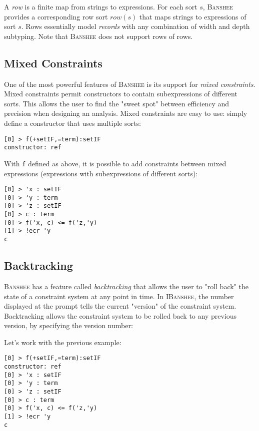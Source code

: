 \documentclass[10pt]{article}
\newcommand{\banshee}{\textsc{Banshee}}
\newcommand{\ibanshee}{\textsc{IBanshee}}
\begin{document}
A \emph{row} is a finite map from strings to expressions. For each
sort $s$, \banshee{} provides a corresponding row sort $row(s)$ that
maps strings to expressions of sort $s$. Rows essentially model
\emph{records} with any combination of width and depth subtyping. Note
that \banshee{} does not support rows of rows.

\subsection{Mixed Constraints}

One of the most powerful features of \banshee{} is its support for
\emph{mixed constraints}. Mixed constraints permit constructors to
contain subexpressions of different sorts. This allows the user to
find the "sweet spot" between efficiency and precision when designing
an analysis. Mixed constraints are easy to use: simply define a
constructor that uses multiple sorts:

\begin{verbatim}
[0] > f(+setIF,=term):setIF
constructor: ref
\end{verbatim}

With \texttt{f} defined as above, it is possible to add constraints
between mixed expressions (expressions with subexpressions of
different sorts):

\begin{verbatim}
[0] > 'x : setIF
[0] > 'y : term
[0] > 'z : setIF
[0] > c : term
[0] > f('x, c) <= f('z,'y)
[1] > !ecr 'y
c
\end{verbatim}

\subsection{Backtracking}

\banshee{} has a feature called \emph{backtracking} that allows the
user to "roll back" the state of a constraint system at any point in
time. In \ibanshee{}, the number displayed at the prompt tells the
current "version" of the constraint system. Backtracking allows the
constraint system to be rolled back to any previous version, by
specifying the version number:

Let's work with the previous example:

\begin{verbatim}
[0] > f(+setIF,=term):setIF
constructor: ref
[0] > 'x : setIF
[0] > 'y : term
[0] > 'z : setIF
[0] > c : term
[0] > f('x, c) <= f('z,'y)
[1] > !ecr 'y
c
\end{verbatim}
\end{document}
